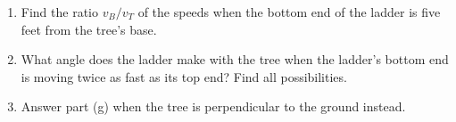 \documentclass{ximera}
\begin{document}
\begin{question}
\begin{enumerate}
\item Find the ratio $v_B/v_T$ of the speeds when the bottom end of the ladder is five feet from the tree's base.

\item What angle does the ladder make with the tree when the ladder's bottom end is moving twice as fast as its top end? Find all possibilities.

\item Answer part (g) when the tree is perpendicular to the ground instead.

\end{enumerate}

\end{question}
\end{document}
